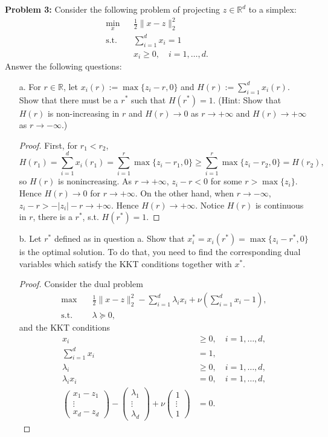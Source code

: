 \documentclass{article}
\begin{document}
\noindent\textbf{Problem 3:} Consider the following problem of projecting $z\in\mathbb{R}^d$ to a simplex:
\begin{eqnarray*}
	\min_{x}&& \frac{1}{2}\|x-z\|_2^2\\
	\text{s.t.}&& \sum_{i=1}^dx_i=1\\
	&& x_i\geq 0, \quad i=1,\dots,d.
\end{eqnarray*}
Answer the following questions:
\begin{enumerate}
\item[a.] For $r\in\mathbb{R}$, let $x_i(r):=\max\{z_i-r,0\}$ and $H(r):=\sum_{i=1}^d x_i(r)$. Show that there must be a $r^*$ such that $H(r^*)=1$. (Hint: Show that $H(r)$ is non-increasing in $r$ and $H(r)\rightarrow 0$ as $r\rightarrow+\infty$ and $H(r)\rightarrow +\infty$ as $r\rightarrow-\infty$.)

\begin{proof}
First, for $r_1 < r_2 $, 
$$
H(r_1) = \sum_{i=1}^{d}x_i(r_1) = \sum_{i=1}^{r}\max\{z_i-r_1, 0\} \ge \sum_{i=1}^{r}\max\{z_i-r_2, 0\} = H(r_2),
$$
so $H(r)$ is nonincreasing. As $r\to+\infty$, $z_i - r < 0$ for some $r > \max\{z_i\}$. Hence $H(r)\to 0$ for $r\to+\infty$. On the other hand, when $r\to-\infty$, $z_i-r > -|z_i|-r\to+\infty $. Hence $H(r)\to+\infty$. Notice $H(r)$ is continuous in $r$, there is a $r^* $, s.t. $H(r^*) = 1$.

\end{proof}

\item[b.] Let $r^*$ defined as in question a. Show that $x_i^*=x_i(r^*)=\max\{z_i-r^*,0\}$ is the optimal solution. To do that, you need to find the corresponding dual variables which satisfy the KKT conditions together with $x^*$.

\begin{proof}
Consider the dual problem
$$
\begin{aligned}
\max\quad &\frac{1}{2}\lVert x-z\rVert_2^2 - \sum_{i=1}^{d}\lambda_ix_i + \nu (\sum_{i=1}^{d}x_i - 1), \\
\text{s.t.}\quad &\lambda \succeq 0,
\end{aligned}
$$
and the KKT conditions
$$
\begin{aligned}
x_i &\ge 0, \quad i = 1,\hdots, d, \\
\sum_{i=1}^{d}x_i &= 1, \\
\lambda_i &\ge 0, \quad i = 1,\hdots, d, \\
\lambda_ix_i &= 0, \quad i = 1,\hdots, d, \\
\begin{pmatrix}
x_1-z_1 \\ \vdots \\ x_d-z_d
\end{pmatrix}
-
\begin{pmatrix}
\lambda_1 \\ \vdots \\ \lambda_d
\end{pmatrix}
+\nu
\begin{pmatrix}
1 \\ \vdots \\ 1
\end{pmatrix}
&= 0.
\end{aligned}
$$
 

\end{proof}
\end{enumerate}
\end{document}
